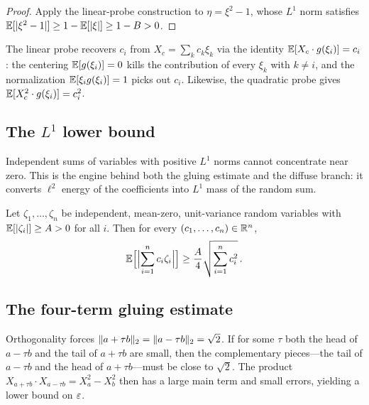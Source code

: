 \begin{proof}
Apply the linear-probe construction to $\eta = \xi^2 - 1$, whose $L^1$ norm
satisfies
$\mathbb{E}[\lvert \xi^2 - 1 \rvert] \ge 1 - \mathbb{E}[\lvert \xi \rvert] \ge 1 - B > 0$.
\end{proof}

\begin{remark}\label{rem:probe-extraction}
The linear probe recovers $c_i$ from $X_c = \sum_k c_k \xi_k$ via the
identity $\mathbb{E}[X_c \cdot g(\xi_i)] = c_i$: the centering $\mathbb{E}[g(\xi_i)] = 0$
kills the contribution of every $\xi_k$ with $k \ne i$, and the
normalization $\mathbb{E}[\xi_i g(\xi_i)] = 1$ picks out $c_i$. Likewise, the
quadratic probe gives $\mathbb{E}[X_c^2 \cdot g(\xi_i)] = c_i^2$.
\end{remark}

\subsection{The $L^1$ lower bound}\label{sec:l1-lower}

Independent sums of variables with positive $L^1$ norms cannot concentrate
near zero. This is the engine behind both the gluing estimate and the
diffuse branch: it converts $\ell^2$ energy of the coefficients into $L^1$
mass of the random sum.

\begin{theorem}%
\label{thm:l1-lower}
Let $\zeta_1, \dots, \zeta_n$ be independent, mean-zero, unit-variance
random variables with $\mathbb{E}[\lvert \zeta_i \rvert] \ge A > 0$ for all $i$. Then
for every $(c_1, \dots, c_n) \in \mathbb{R}^n$,
\[
\mathbb{E}\Bigl[\Bigl\lvert \sum_{i=1}^n c_i \zeta_i
\Bigr\rvert\Bigr]
\ge \frac{A}{4}
\sqrt{\sum_{i=1}^n c_i^2}\,.
\]
\end{theorem}

\subsection{The four-term gluing estimate}\label{sec:gluing}

Orthogonality forces $\lVert a + \tau b \rVert_2 = \lVert a - \tau b \rVert_2 = \sqrt{2}$.
If for some $\tau$ both the head of $a - \tau b$ and the tail of
$a + \tau b$ are small, then the complementary pieces---the tail of
$a - \tau b$ and the head of $a + \tau b$---must be close to $\sqrt{2}$.
The product $X_{a+\tau b} \cdot X_{a-\tau b} = X_a^2 - X_b^2$ then has a
large main term and small errors, yielding a lower bound on $\varepsilon$.

